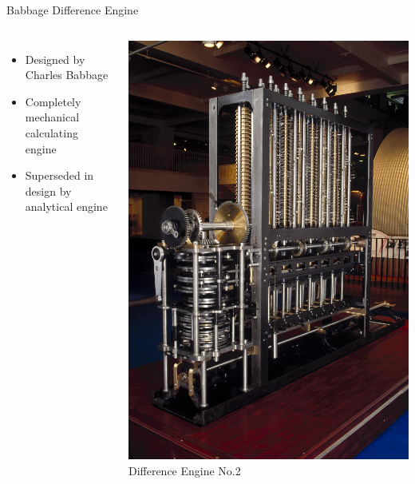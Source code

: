 \documentclass{beamer}
\begin{document}
\begin{frame}{Babbage Difference Engine}
  \begin{columns}

    \begin{itemize}
    \item
      Designed by Charles Babbage \cite{BabbageBio}
    \item
      Completely mechanical calculating engine 
    \item
      Superseded in design by analytical engine \cite{AnalyticalEngine}
      
    \end{itemize}

    \begin{center}
      \includegraphics[scale=0.4]{../assets/Difference_Engine_London.eps}
      \cite{BabbageEngine} Difference Engine No.2
    \end{center}

  \end{columns}
\end{frame}
\end{document}
